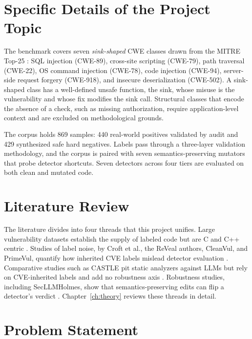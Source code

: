
\section{Specific Details of the Project Topic}

The benchmark covers seven \emph{sink-shaped} CWE classes drawn from the MITRE
Top-25 \cite{mitre_top25}: SQL injection (CWE-89), cross-site scripting
(CWE-79), path traversal (CWE-22), OS command injection (CWE-78), code
injection (CWE-94), server-side request forgery (CWE-918), and insecure
deserialization (CWE-502). A sink-shaped class has a well-defined unsafe
function, the sink, whose misuse is the vulnerability and whose fix modifies
the sink call. Structural classes that encode the absence of a check, such as
missing authorization, require application-level context and are excluded on
methodological grounds.

The corpus holds 869 samples: 440 real-world positives validated by audit and
429 synthesized safe hard negatives. Labels pass through a three-layer
validation methodology, and the corpus is paired with seven semantics-preserving
mutators that probe detector shortcuts. Seven detectors across four tiers are
evaluated on both clean and mutated code.

\section{Literature Review}

The literature divides into four threads that this project unifies. Large
vulnerability datasets establish the supply of labeled code but are C and C++
centric \cite{bigvul,diversevul}. Studies of label noise, by Croft et al., the
ReVeal authors, CleanVul, and PrimeVul, quantify how inherited CVE labels
mislead detector evaluation \cite{croft,reveal,cleanvul,primevul}. Comparative
studies such as CASTLE pit static analyzers against LLMs but rely on
CVE-inherited labels and add no robustness axis \cite{castle}. Robustness
studies, including SecLLMHolmes, show that semantics-preserving edits can flip a
detector's verdict \cite{secllmholmes}. Chapter~\ref{ch:theory} reviews these
threads in detail.

\section{Problem Statement}

